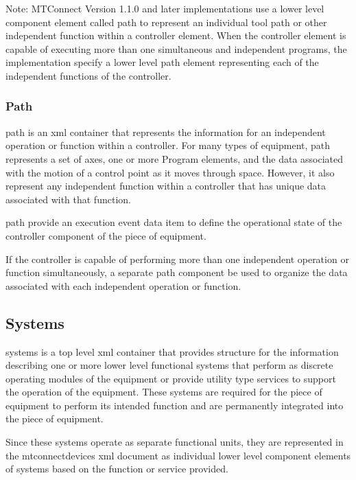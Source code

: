 \begin{note}
Note: MTConnect Version 1.1.0 and later implementations \should use a \gls{lower level} \gls{component} element called \gls{path} to represent an individual tool path or other independent function within a \gls{controller} element.  When the \gls{controller} element is capable of executing more than one simultaneous and independent programs, the implementation \must specify a \gls{lower level} \gls{path} element representing each of the independent functions of the \gls{controller}.

\end{note}

\subsubsection{Path}

\gls{path} is an \gls{xml} container that represents the information for an independent operation or function within a \gls{controller}.  For many types of equipment, \gls{path} represents a set of \gls{axes}, one or more Program elements, and the data associated with the motion of a control point as it moves through space.   However, it \may also represent any independent function within a \gls{controller} that has unique data associated with that function.

\gls{path} \should provide an \gls{execution event} data item to define the operational state of the \gls{controller} component of the piece of equipment.

If the \gls{controller} is capable of performing more than one independent operation or function simultaneously, a separate \gls{path} component \must be used to organize the data associated with each independent operation or function.

\subsection{Systems}

\gls{systems} is a \gls{top level} \gls{xml} container that provides structure for the information describing one or more \gls{lower level} functional systems that perform as discrete operating modules of the equipment or provide utility type services to support the operation of the equipment. These systems are required for the piece of equipment to perform its intended function and are permanently integrated into the piece of equipment.

Since these systems operate as separate functional units, they are represented in the \gls{mtconnectdevices} \gls{xml} document as individual \gls{lower level} \gls{component} elements of \gls{systems} based on the function or service provided. 


